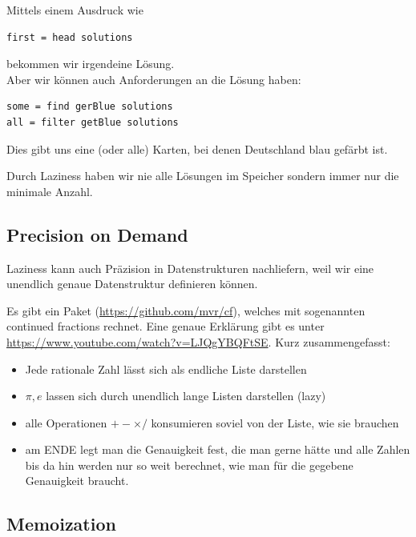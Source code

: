 \documentclass{beamer}
\begin{document}
\begin{frame}[fragile]
Mittels einem Ausdruck wie
\begin{verbatim}
first = head solutions
\end{verbatim}
bekommen wir irgendeine Lösung.\\\pause
Aber wir können auch Anforderungen an die Lösung haben:
\begin{verbatim}
some = find gerBlue solutions
all = filter getBlue solutions
\end{verbatim}
\pause
Dies gibt uns eine (oder alle) Karten, bei denen Deutschland blau gefärbt ist.\\\pause\par\bigskip
Durch Laziness haben wir nie alle Lösungen im Speicher sondern immer nur die minimale Anzahl.
\end{frame}

\subsection{Precision on Demand}

\begin{frame}[fragile]
Laziness kann auch Präzision in Datenstrukturen nachliefern, weil wir eine unendlich genaue Datenstruktur definieren können.\pause

Es gibt ein Paket (\url{https://github.com/mvr/cf}), welches mit sogenannten continued fractions rechnet.\pause
Eine genaue Erklärung gibt es unter \url{https://www.youtube.com/watch?v=LJQgYBQFtSE}. Kurz zusammengefasst:\\\pause

\begin{itemize}
 \item Jede rationale Zahl lässt sich als endliche Liste darstellen
 \pause
 \item $\pi,e$ lassen sich durch unendlich lange Listen darstellen (lazy)
 \pause
 \item alle Operationen $+ - \times /$ konsumieren soviel von der Liste, wie sie brauchen
 \pause
 \item am ENDE legt man die Genauigkeit fest, die man gerne hätte und alle Zahlen bis da hin werden nur so weit berechnet, wie man für die gegebene Genauigkeit braucht.
\end{itemize}

\end{frame}

\subsection{Memoization}
\end{document}
